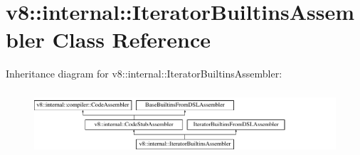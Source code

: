 \hypertarget{classv8_1_1internal_1_1IteratorBuiltinsAssembler}{}\section{v8\+:\+:internal\+:\+:Iterator\+Builtins\+Assembler Class Reference}
\label{classv8_1_1internal_1_1IteratorBuiltinsAssembler}
Inheritance diagram for v8\+:\+:internal\+:\+:Iterator\+Builtins\+Assembler\+:\begin{figure}[H]
\begin{center}
\leavevmode
\includegraphics[height=2.424242cm]{classv8_1_1internal_1_1IteratorBuiltinsAssembler}
\end{center}
\end{figure}
